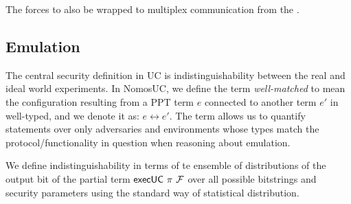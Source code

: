 The \partywrapper forces \F to also be wrapped to multiplex communication from the \partywrapper. 

\subsection{Emulation}
The central security definition in UC is indistinguishability between the real and ideal world experiments.
In NomosUC, we define the term \textit{well-matched} to mean the configuration resulting from a PPT term $e$ connected to another term $e'$ in well-typed, and we denote it as: $e \leftrightarrow e'$.
The term allows us to quantify statements over only adversaries and environments whose types match the protocol/functionality in question when reasoning about emulation. 

We define indistinguishability in terms of te ensemble of distributions of the output bit of the partial term $\mathsf{execUC}\ \pi\ \mathcal{F}$ over all possible bitstrings and security parameters using the standard way of statistical distribution.  


